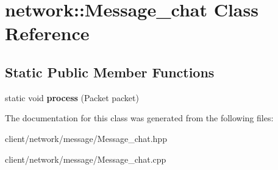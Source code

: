 \hypertarget{classnetwork_1_1_message__chat}{\section{network\-:\-:Message\-\_\-chat Class Reference}
\label{classnetwork_1_1_message__chat}
}
\subsection*{Static Public Member Functions}
\begin{DoxyCompactItemize}
\item 
\hypertarget{classnetwork_1_1_message__chat_af58fe1d7c5efa69d3be4b8c52a0abca8}{static void {\bfseries process} (Packet packet)}\label{classnetwork_1_1_message__chat_af58fe1d7c5efa69d3be4b8c52a0abca8}

\end{DoxyCompactItemize}


The documentation for this class was generated from the following files\-:\begin{DoxyCompactItemize}
\item 
client/network/message/Message\-\_\-chat.\-hpp\item 
client/network/message/Message\-\_\-chat.\-cpp\end{DoxyCompactItemize}
